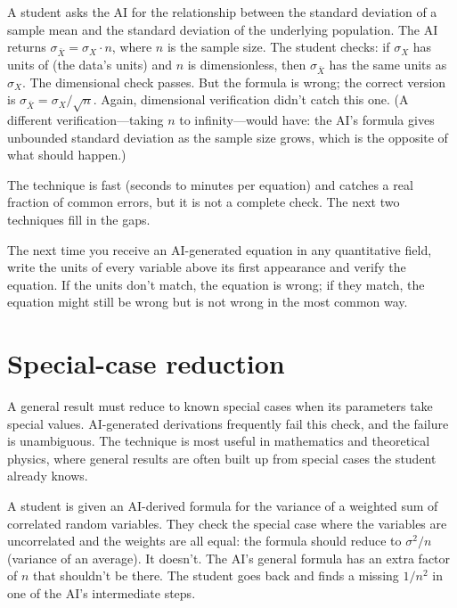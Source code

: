 \documentclass[11pt]{book}
\begin{document}
\begin{example}
A student asks the AI for the relationship between the standard deviation of a sample mean and the standard deviation of the underlying population. The AI returns $\sigma_{\bar{X}} = \sigma_X \cdot n$, where $n$ is the sample size. The student checks: if $\sigma_X$ has units of (the data's units) and $n$ is dimensionless, then $\sigma_{\bar{X}}$ has the same units as $\sigma_X$. The dimensional check passes. But the formula is wrong; the correct version is $\sigma_{\bar{X}} = \sigma_X / \sqrt{n}$. Again, dimensional verification didn't catch this one. (A different verification---taking $n$ to infinity---would have: the AI's formula gives unbounded standard deviation as the sample size grows, which is the opposite of what should happen.)
\end{example}

The technique is fast (seconds to minutes per equation) and catches a real fraction of common errors, but it is not a complete check. The next two techniques fill in the gaps.

\begin{tryit}
The next time you receive an AI-generated equation in any quantitative field, write the units of every variable above its first appearance and verify the equation. If the units don't match, the equation is wrong; if they match, the equation might still be wrong but is not wrong in the most common way.
\end{tryit}

\section{Special-case reduction}

A general result must reduce to known special cases when its parameters take special values. AI-generated derivations frequently fail this check, and the failure is unambiguous. The technique is most useful in mathematics and theoretical physics, where general results are often built up from special cases the student already knows.

\begin{example}
A student is given an AI-derived formula for the variance of a weighted sum of correlated random variables. They check the special case where the variables are uncorrelated and the weights are all equal: the formula should reduce to $\sigma^2 / n$ (variance of an average). It doesn't. The AI's general formula has an extra factor of $n$ that shouldn't be there. The student goes back and finds a missing $1/n^2$ in one of the AI's intermediate steps.
\end{example}
\end{document}

